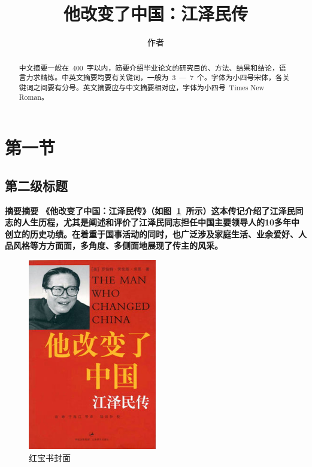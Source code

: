 \baselineskip=20pt
\title{他改变了中国：江泽民传}    	%
\author{作者}            					%
\makecover
\begin{abstract}
\par\setlength{\parindent}{2em} 中文摘要一般在~400~字以内，简要介绍毕业论文的研究目的、方法、结果和结论，语言力求精炼。中英文摘要均要有关键词，一般为~3~—~7~个。字体为小四号宋体，各关键词之间要有分号。英文摘要应与中文摘要相对应，字体为小四号~Times New Roman。
\end{abstract}

\section{第一节}
\subsection{第二级标题}
\bfseries{摘要}摘要
《他改变了中国：江泽民传》（如图~\ref{book}~所示）这本传记介绍了江泽民同志的人生历程，尤其是阐述和评价了江泽民同志担任中国主要领导人的10多年中创立的历史功绩。在着重于国事活动的同时，也广泛涉及家庭生活、业余爱好、人品风格等方方面面，多角度、多侧面地展现了传主的风采。

\begin{figure}[htbp!]
	\centering
	\includegraphics[width=0.5\textwidth]{figures/The_Man_Who_Changed_China.png}
	\caption{红宝书封面}\label{book}
	\vspace{-1em}
\end{figure}	

